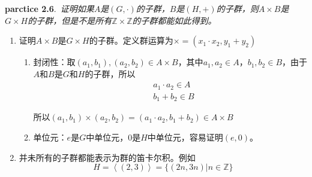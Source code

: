 \begin{mdframed}
    \textbf{parctice 2.6}.\ \textsl{证明如果$A$是$(G,\cdot)$的子群，$B$是$(H,+)$的子群，则$A\times B$是$G\times H$的子群，但是不是所有$\mathbb{Z}\times \mathbb{Z}$的子群都能如此得到。}

    \begin{enumerate}
        \item 证明$A\times B$是$G\times H$的子群。定义群运算为$\times=(x_1\cdot x_2,y_1+y_2)$
        \begin{enumerate}[itemindent=2em]
            \item 封闭性：取$(a_1,b_1),(a_2,b_2)\in A\times B$，其中$a_1,a_2\in A$，$b_1,b_2\in B$，由于$A$和$B$是$G$和$H$的子群，所以
            \begin{equation}
                \begin{aligned}
                    & a_1\cdot a_2\in A\\
                    & b_1+b_2 \in B
                \end{aligned}
            \end{equation}

            所以$(a_1,b_1)\times (a_2,b_2)=(a_1\cdot a_2,b_1+b_2)\in A\times B$

            \item 单位元：$e$是$G$中单位元，$0$是$H$中单位元，容易证明$(e,0)$。
        \end{enumerate}

        \item 并未所有的子群都能表示为群的笛卡尔积。例如
        \begin{equation}
            H=\left\langle (2,3)\right\rangle =\{(2n,3n)|n\in \mathbb{Z}\}
        \end{equation}
    \end{enumerate}
\end{mdframed}

\newpage

